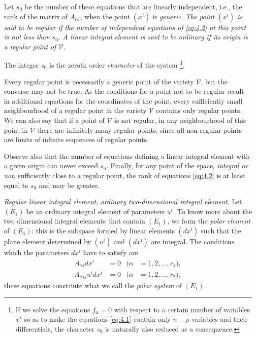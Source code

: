 \documentclass[leqno,11pt]{book}
\numberwithin{equation}{chapter}
\theoremstyle{shape1}
\theoremstyle{shape0}
\theoremstyle{shape2}
\theoremstyle{definition}
\begin{document}
Let $s_{0}$ be the number of these equations that are linearly independent, {i.e.}, the rank of the matrix of $A_{\alpha i}$, when the point $(x^{i})$ is \emph{generic}. \emph{The point $(x^{i})$ is said to be regular if  the number of independent equations of \eqref{eq:4.2} at this point is not less than $s_{0}$. A linear integral element is said to be ordinary if its origin is a regular point of $\mathcal{V}$.}

The integer $s_{0}$ is the zeroth order \emph{character}  of the system \footnote{If we solve the equations $f_\alpha=0$ with respect to a certain number of variables $x^{i}$ so as to make the equations \eqref{eq:4.1} contain only $n-\rho$ variables and their differentials, the character $s_{0}$ is naturally also reduced as a consequence.}.

Every regular point is necessarily a generic point of the variety $\mathcal{V}$, but the converse may not be true. As the conditions for a point not to be regular result in additional equations for the coordinates of the point, every sufficiently small neighbourhood of a regular point in the variety $\mathcal{V}$ contains only regular points. We can also say that if a point of $\mathcal{V}$ is not regular, in any neighbourhood of this point in $\mathcal{V}$ there are infinitely many regular points, since all non-regular points are limits of infinite sequences of regular points.

Observe also that the number of equations defining a linear integral element with a given origin can never exceed $s_{0}$. Finally, for any point of the space, \emph{integral or not}, sufficiently close to a regular point, the rank of equations \eqref{eq:4.2} is at least equal to $s_{0}$ and may be greater.

\vspace{12pt}\fsec \emph{Regular linear integral element, ordinary two-dimensional integral element.} Let $(E_{1})$ be an ordinary integral element of parameters $u^{i}$. To know more about the two dimensional integral elements that contain $(E_{1})$,  we  form the \emph{polar element} of $(E_{1})$: this is the subspace formed by linear elements $(dx^{i}
)$ such that the plane element determined by $(u^{i})$ and $(dx^{i})$ are integral. The conditions which the parameters $dx^{i}$ have to satisfy are
\begin{align}
  \label{eq:4.3}
  A_{\alpha i}dx^{i}&=0&(\alpha&=1,2,\dots,r_{1}),\\
  \label{eq:4.4}
  A_{\alpha ij}u^{i}dx^{j}&=0&(\alpha&=1,2,\dots,r_{2}),
\end{align}
these equations constitute what we call the \emph{polar system} of $(E_{1})$.
\end{document}
